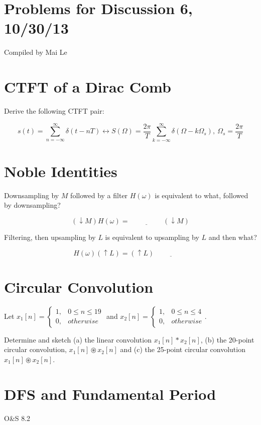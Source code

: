 \documentclass[11pt]{article}
\begin{document}
{\small
\section*{Problems for Discussion 6, 10/30/13}
Compiled by Mai Le
}

\section{CTFT of a Dirac Comb}

Derive the following CTFT pair:

\[
s(t) = \sum_{n=-\infty}^\infty \delta(t-nT) \leftrightarrow S(\Omega) = \frac{2 \pi}{T} \sum_{k=-\infty}^\infty \delta(\Omega - k\Omega_s),\ \Omega_s = \frac{2\pi}{T}
\]

\section{Noble Identities}

Downsampling by $M$ followed by a filter $H(\omega)$ is equivalent to what, followed by downsampling?

\[
(\downarrow M)H(\omega) = \underline{\hspace{2cm}} (\downarrow M)
\]

Filtering, then upsampling by $L$ is equivalent to upsampling by $L$ and then what?

\[
H(\omega)(\uparrow L) = (\uparrow L) \underline{\hspace{2cm}}
\]

\section{Circular Convolution}

Let $x_1[n] = \begin{cases} 1, & 0 \leq n \leq 19 \\
0, & otherwise
\end{cases}$ and $x_2[n] = \begin{cases} 1, & 0 \leq n \leq 4 \\
0, & otherwise
\end{cases}$. 

Determine and sketch (a) the linear convolution $x_1[n]*x_2[n]$, (b) the 20-point circular convolution, $x_1[n]\circledast x_2[n]$ and (c) the 25-point circular convolution $x_1[n]\circledast x_2[n]$.

\newpage 
\section{DFS and Fundamental Period}
O\&S 8.2
\end{document}
